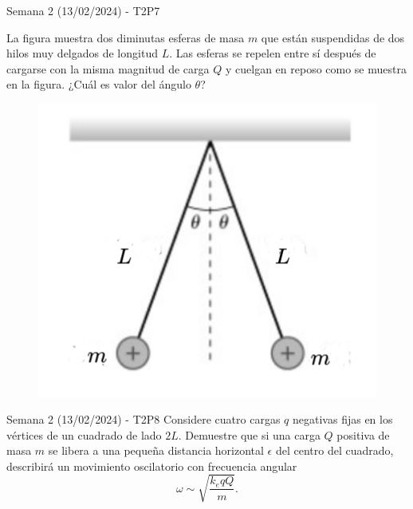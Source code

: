 \begin{frame}{Semana 2 (13/02/2024) - T2P7}
    
    La figura muestra dos diminutas esferas de masa $m$ que est\'an suspendidas de dos hilos muy delgados de longitud $L$. Las esferas se repelen entre sí después de cargarse con la misma magnitud de carga $Q$ y cuelgan en reposo como se muestra en la figura. ¿Cuál es valor del ángulo $\theta$?
    
    \begin{figure}
        \centering
        \includegraphics[scale=0.4]{figures/t2p7.png}
    \end{figure}
    
\end{frame}

\begin{frame}{Semana 2 (13/02/2024) - T2P8}
Considere cuatro cargas $q$ negativas fijas en los vértices de un cuadrado de lado $2L$.
Demuestre que si una carga $Q$ positiva de masa $m$ se libera a una pequeña distancia horizontal $\epsilon$ del centro del cuadrado, describirá un movimiento oscilatorio con frecuencia angular $$\omega\sim\sqrt{\frac{k_eqQ}{m}}.$$
\end{frame}